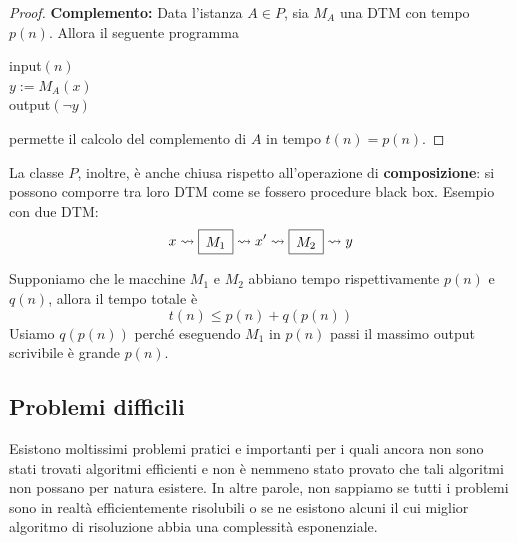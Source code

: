 \begin{proof}
	\textbf{Complemento:} Data l'istanza $A \in P$, sia $M_A$ una DTM con tempo $p(n)$. Allora il seguente programma
	\begin{center}
		\begin{minipage}{.33\textwidth}
			\begin{tcolorbox}[
				colback=white,
				sharp corners,
				boxrule=.3mm,
				left=20pt,
				top=0pt,
				bottom=0pt,
				colbacktitle=white,
				coltitle=black
				]
				\begin{algorithm}[H]
					\SetAlgoNoEnd
					input$(n)$\\
					$y := M_A (x)$\\
					output$(\neg y)$
				\end{algorithm}
			\end{tcolorbox}
		\end{minipage}
	\end{center}
	permette il calcolo del complemento di $A$ in tempo $t(n) = p(n)$.
\end{proof}

La classe $P$, inoltre, è anche chiusa rispetto all'operazione di \textbf{composizione}: si possono comporre tra loro DTM come se fossero procedure black box. Esempio con due DTM:
$$ 
\renewcommand{\arraystretch}{1.4}
x \rightsquigarrow \begin{array}{|c|}
	\hline
	M_1 \\
	\hline
\end{array} \rightsquigarrow x' \rightsquigarrow \begin{array}{|c|}
\hline
M_2 \\
\hline
\end{array} \rightsquigarrow y $$

Supponiamo che le macchine $M_1$ e $M_2$ abbiano tempo rispettivamente $p(n)$ e $q(n)$, allora il tempo totale è 
$$ t(n) \leq p(n) + q(p(n)) $$
Usiamo $q(p(n))$ perché eseguendo $M_1$ in $p(n)$ passi il massimo output scrivibile è grande $p(n)$.

\subsection{Problemi difficili}

Esistono moltissimi problemi pratici e importanti per i quali ancora non sono stati trovati algoritmi efficienti e non è nemmeno stato provato che tali algoritmi non possano per natura esistere. In altre parole, non sappiamo se tutti i problemi sono in realtà efficientemente risolubili o se ne esistono alcuni il cui miglior algoritmo di risoluzione abbia una complessità esponenziale.

